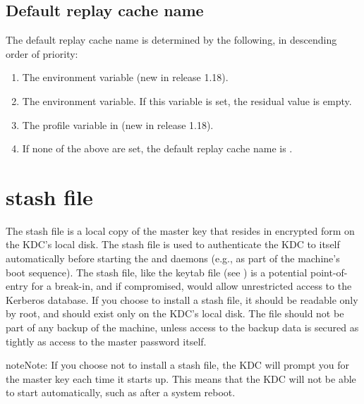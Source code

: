 \documentclass[letterpaper,10pt,english]{sphinxmanual}
\begin{document}
\section{Default replay cache name}
\label{\detokenize{basic/rcache_def:default-replay-cache-name}}
The default replay cache name is determined by the following, in
descending order of priority:
\begin{enumerate}
\item {} 
The  environment variable (new in release 1.18).

\item {} 
The  environment variable.  If this variable is
set, the residual value is empty.

\item {} 
The  profile variable in 
(new in release 1.18).

\item {} 
If none of the above are set, the default replay cache name is
.

\end{enumerate}


\chapter{stash file}
\label{\detokenize{basic/stash_file_def:stash-file}}\label{\detokenize{basic/stash_file_def::doc}}\label{\detokenize{basic/stash_file_def:stash-definition}}
The stash file is a local copy of the master key that resides in
encrypted form on the KDC’s local disk.  The stash file is used to
authenticate the KDC to itself automatically before starting the
 and  daemons (e.g., as part of the
machine’s boot sequence).  The stash file, like the keytab file (see
) is a potential point-of-entry for a break-in, and
if compromised, would allow unrestricted access to the Kerberos
database.  If you choose to install a stash file, it should be
readable only by root, and should exist only on the KDC’s local disk.
The file should not be part of any backup of the machine, unless
access to the backup data is secured as tightly as access to the
master password itself.

\begin{sphinxadmonition}{note}{Note:}
If you choose not to install a stash file, the KDC will prompt you for the master key each time it starts up.
This means that the KDC will not be able to start automatically, such as after a system reboot.
\end{sphinxadmonition}
\end{document}
